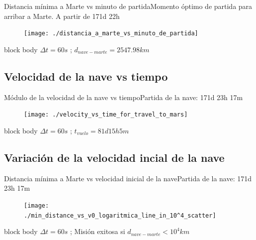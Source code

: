 \documentclass{beamer}
\begin{document}
            \begin{frame}{Distancia mínima a Marte vs minuto de partida}{Momento óptimo de partida para arribar a Marte. A partir de 171d 22h}
                \begin{figure}[H!]
                    \texttt{[image: ./distancia\_a\_marte\_vs\_minuto\_de\_partida]}
                    \label{fig:marte_7}
                \end{figure}
                \begin{beamercolorbox}[sep=5pt,center]{block body}
                    \centering
                    \small{$\Delta t = 60s$ ; $d_{nave-marte} = 2547.98 km$}
                \end{beamercolorbox}
            \end{frame}

        \subsection{Velocidad de la nave vs tiempo}

            \begin{frame}{Módulo de la velocidad de la nave vs tiempo}{Partida de la nave: 171d 23h 17m}
                \begin{figure}[H!]
                    \texttt{[image: ./velocity\_vs\_time\_for\_travel\_to\_mars]}
                    \label{fig:marte_8}
                \end{figure}
                \begin{beamercolorbox}[sep=5pt,center]{block body}
                    \centering
                    \small{$\Delta t = 60s$ ; $t_{vuelo} = 81d 15h 5m$}
                \end{beamercolorbox}
            \end{frame}

        \subsection{Variación de la velocidad incial de la nave}

            \begin{frame}{Distancia mínima a Marte vs velocidad inicial de la nave}{Partida de la nave: 171d 23h 17m}
                \begin{figure}[H!]
                    \texttt{[image: ./min\_distance\_vs\_v0\_logaritmica\_line\_in\_10^4\_scatter]}
                    \label{fig:marte_9}
                \end{figure}
                \begin{beamercolorbox}[sep=5pt,center]{block body}
                    \centering
                    \small{$\Delta t = 60s$ ; Misión exitosa si $d_{nave-marte} < 10^4 km$}
                \end{beamercolorbox}
            \end{frame}
\end{document}
